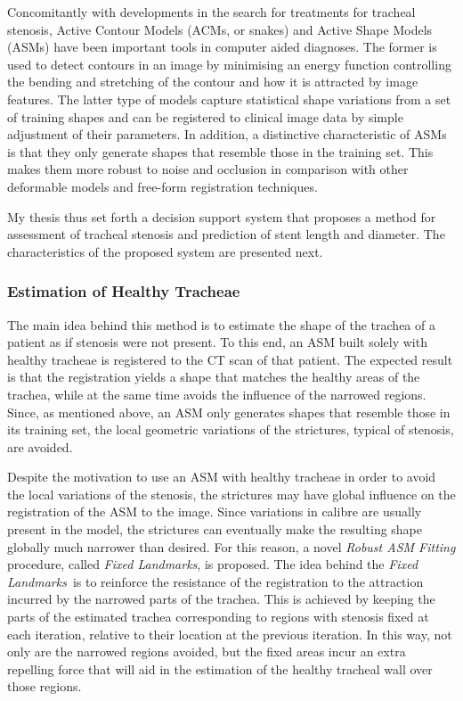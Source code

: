 \documentclass[a4paper]{article}
\newcommand{\fixedland}{{\it Fixed Landmarks}}
\begin{document}
Concomitantly with developments in the search for treatments for tracheal stenosis, Active Contour Models (ACMs, or snakes) and Active Shape Models (ASMs) have been important tools in computer aided diagnoses. The former is used to detect contours in an image by minimising an energy function controlling the bending and stretching of the contour and how it is attracted by image features. The latter type of models capture statistical shape variations from a set of training shapes and can be registered to clinical image data by simple adjustment of their parameters. In addition, a distinctive characteristic of ASMs is that they only generate shapes that resemble those in the training set. This makes them more robust to noise and occlusion in comparison with other deformable models and free-form registration techniques.

My thesis thus set forth a decision support system that proposes a method for assessment of tracheal stenosis and prediction of stent length and diameter. The characteristics of the proposed system are presented next.

\subsubsection{Estimation of Healthy Tracheae}

The main idea behind this method is to estimate the shape of the trachea of a patient as if stenosis were not present. To this end, an ASM built solely with healthy tracheae is registered to the CT scan of that patient. The expected result is that the registration yields a shape that matches the healthy areas of the trachea, while at the same time avoids the influence of the narrowed regions. Since, as mentioned above, an ASM only generates shapes that resemble those in its training set, the local geometric variations of the strictures, typical of stenosis, are avoided. 

Despite the motivation to use an ASM with healthy tracheae in order to avoid the local variations of the stenosis, the strictures may have global influence on the registration of the ASM to the image. Since variations in calibre are usually present in the model, the strictures can eventually make the resulting shape globally much narrower than desired. For this reason, a novel {\em Robust ASM Fitting} procedure, called \fixedland, is proposed. The idea behind the \fixedland\ is to reinforce the resistance of the registration to the attraction incurred by the narrowed parts of the trachea. This is achieved by keeping the parts of the estimated trachea corresponding to regions with stenosis fixed at each iteration, relative to their location at the previous iteration. In this way, not only are the narrowed regions avoided, but the fixed areas incur an extra repelling force that will aid in the estimation of the healthy tracheal wall over those regions.
\end{document}
